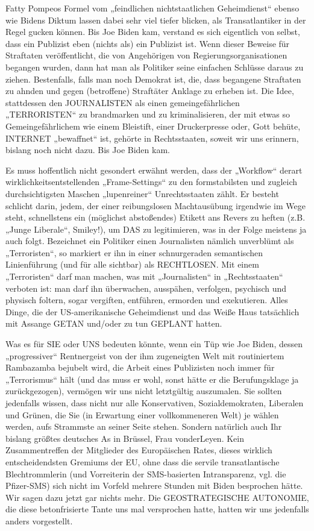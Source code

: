 \begin{multicols}{2}
Fatty Pompeos Formel vom „feindlichen nichtstaatlichen Geheimdienst“ ebenso wie Bidens Diktum lassen
dabei sehr viel tiefer blicken, als Transatlantiker in der
Regel gucken können. Bis Joe Biden kam, verstand es
sich eigentlich von selbst, dass ein Publizist eben (nichts
als) ein Publizist ist. Wenn dieser Beweise für Straftaten
veröffentlicht, die von Angehörigen von Regierungsorganisationen begangen wurden, dann hat man als Politiker
seine einfachen Schlüsse daraus zu ziehen. Bestenfalls,
falls man noch Demokrat ist, die, dass begangene Straftaten zu ahnden und gegen (betroffene) Straftäter Anklage zu erheben ist. Die Idee, stattdessen den JOURNALISTEN als einen gemeingefährlichen „TERRORISTEN“
zu brandmarken und zu kriminalisieren, der mit etwas
so Gemeingefährlichem wie einem Bleistift, einer Druckerpresse oder, Gott behüte, INTERNET „bewaffnet“
ist, gehörte in Rechtsstaaten, soweit wir uns erinnern,
bislang noch nicht dazu. Bis Joe Biden kam.

Es muss hoffentlich nicht gesondert erwähnt werden,
dass der „Workflow“ derart wirklichkeitsentstellenden
„Frame-Settings“ zu den formstabilsten und zugleich
durchsichtigsten Maschen „lupenreiner“ Unrechtsstaaten zählt. Er besteht schlicht darin, jedem, der einer reibungslosen Machtausübung irgendwie im Wege steht,
schnellstens ein (möglichst abstoßendes) Etikett ans Revers zu heften (z.B. „Junge Liberale“, Smiley!), um DAS
zu legitimieren, was in der Folge meistens ja auch folgt.
Bezeichnet ein Politiker einen Journalisten nämlich unverblümt als „Terroristen“, so markiert er ihn in einer
schnurgeraden semantischen Linienführung (und für
alle sichtbar) als RECHTLOSEN. Mit einem „Terroristen“
darf man machen, was mit „Journalisten“ in „Rechtsstaaten“ verboten ist: man darf ihn überwachen, ausspähen,
verfolgen, psychisch und physisch foltern, sogar vergiften, entführen, ermorden und exekutieren. Alles Dinge,
die der US-amerikanische Geheimdienst und das Weiße
Haus tatsächlich mit Assange GETAN und/oder zu tun
GEPLANT hatten.

Was es für SIE oder UNS bedeuten könnte, wenn ein
Tüp wie Joe Biden, dessen „progressiver“ Rentnergeist
von der ihm zugeneigten Welt mit routiniertem Rambazamba bejubelt wird, die Arbeit eines Publizisten noch
immer für „Terrorismus“ hält (und das muss er wohl,
sonst hätte er die Berufungsklage ja zurückgezogen),
vermögen wir uns nicht letztgültig auszumalen. Sie
sollten jedenfalls wissen, dass nicht nur alle Konservativen, Sozialdemokraten, Liberalen und Grünen, die Sie
(in Erwartung einer vollkommeneren Welt) je wählen
werden, aufs Strammste an seiner Seite stehen. Sondern natürlich auch Ihr bislang größtes deutsches As in
Brüssel, Frau vonderLeyen. Kein Zusammentreffen der
Mitglieder des Europäischen Rates, dieses wirklich entscheidendsten Gremiums der EU, ohne dass die servile
transatlantische Blechtrommlerin (und Vorreiterin der
SMS-basierten Intransparenz, vgl. die Pfizer-SMS) sich
nicht im Vorfeld mehrere Stunden mit Biden besprochen
hätte. Wir sagen dazu jetzt gar nichts mehr. Die GEOSTRATEGISCHE AUTONOMIE, die diese betonfrisierte
Tante uns mal versprochen hatte, hatten wir uns jedenfalls anders vorgestellt.


\end{multicols}
